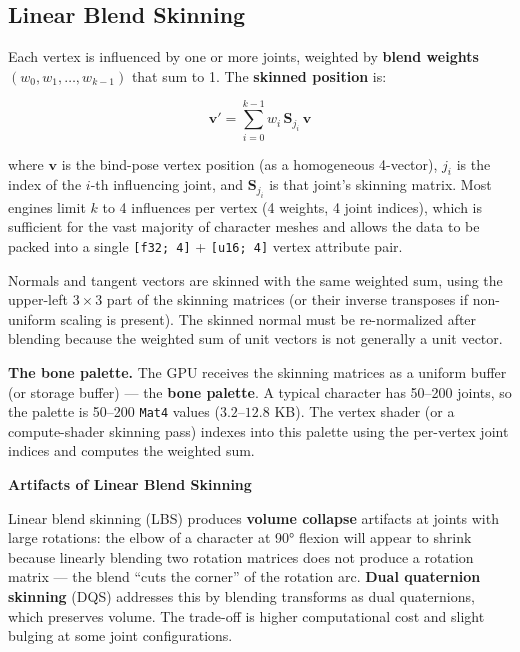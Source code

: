 \documentclass[
  11pt,
  letterpaper,
  DIV=11,
  numbers=noendperiod,
  twoside,
  open=right]{scrreprt}
\begin{document}
\subsection{Linear Blend Skinning}\label{linear-blend-skinning}

Each vertex is influenced by one or more joints, weighted by
\textbf{blend weights} \((w_0, w_1, \ldots, w_{k-1})\) that sum to 1.
The \textbf{skinned position} is:

\[
\mathbf{v}' = \sum_{i=0}^{k-1} w_i \, \mathbf{S}_{j_i} \, \mathbf{v}
\]

where \(\mathbf{v}\) is the bind-pose vertex position (as a homogeneous
4-vector), \(j_i\) is the index of the \(i\)-th influencing joint, and
\(\mathbf{S}_{j_i}\) is that joint's skinning matrix. Most engines limit
\(k\) to 4 influences per vertex (4 weights, 4 joint indices), which is
sufficient for the vast majority of character meshes and allows the data
to be packed into a single \texttt{{[}f32;\ 4{]}} +
\texttt{{[}u16;\ 4{]}} vertex attribute pair.

Normals and tangent vectors are skinned with the same weighted sum,
using the upper-left \(3 \times 3\) part of the skinning matrices (or
their inverse transposes if non-uniform scaling is present). The skinned
normal must be re-normalized after blending because the weighted sum of
unit vectors is not generally a unit vector.

\textbf{The bone palette.} The GPU receives the skinning matrices as a
uniform buffer (or storage buffer) --- the \textbf{bone palette}. A
typical character has 50--200 joints, so the palette is 50--200
\texttt{Mat4} values (\(3.2\)--\(12.8\) KB). The vertex shader (or a
compute-shader skinning pass) indexes into this palette using the
per-vertex joint indices and computes the weighted sum.

\begin{tcolorbox}[enhanced jigsaw, arc=.35mm, bottomrule=.15mm, breakable, colback=white, colframe=quarto-callout-warning-color-frame, left=2mm, leftrule=.75mm, opacityback=0, rightrule=.15mm, toprule=.15mm]
\begin{minipage}[t]{5.5mm}
\textcolor{quarto-callout-warning-color}{\faExclamationTriangle}
\end{minipage}%
\begin{minipage}[t]{\textwidth - 5.5mm}

\vspace{-3mm}\textbf{Artifacts of Linear Blend Skinning}\vspace{3mm}

Linear blend skinning (LBS) produces \textbf{volume collapse} artifacts
at joints with large rotations: the elbow of a character at 90° flexion
will appear to shrink because linearly blending two rotation matrices
does not produce a rotation matrix --- the blend ``cuts the corner'' of
the rotation arc. \textbf{Dual quaternion skinning} (DQS) addresses this
by blending transforms as dual quaternions, which preserves volume. The
trade-off is higher computational cost and slight bulging at some joint
configurations.

\end{minipage}%
\end{tcolorbox}
\end{document}
